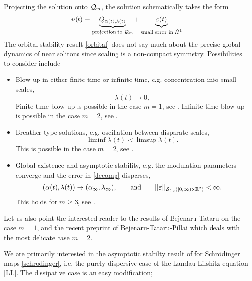 Projecting the solution onto $\mathcal Q_m$, the solution schematically takes the form 
\begin{equation}\label{eq:decomp}
	u(t) = \underbrace{Q_{\alpha(t), \lambda(t)}}_{\text{projection to $\mathcal Q_m$}} + \underbrace{\varepsilon(t)}_{\text{small error in $\dot H^1$}}
\end{equation}
The orbital stability result \eqref{orbital} does not say much about the precise global dynamics of near solitons since scaling is a non-compact symmetry. Possibilities to consider include 
	\begin{itemize}
		\item Blow-up in either finite-time or infinite time, e.g. concentration into small scales,
			\[\lambda(t) \to 0,\]
		Finite-time blow-up is possible in the case $m = 1$, see \cite{merle2011blow,perelman2014blow}. Infinite-time blow-up is possible in the case $m = 2$, see \cite[Theorem 2]{GustafsonEtAl2010}.

		\item Breather-type solutions, e.g. oscillation between disparate scales, 
			\[
				\liminf \lambda(t) < \limsup \lambda(t). 
			\]
		This is possible in the case $m = 2$, see \cite[Theorem 2]{GustafsonEtAl2010}.

		\item Global existence and asymptotic stability, e.g. the modulation parameters converge and the error in \eqref{decomp} disperses, 
			\begin{align*}
				(\alpha(t), \lambda(t)) 
					\to (\alpha_\infty,\lambda_\infty),\qquad \text{and} \qquad
				||\varepsilon||_{\mathcal S_{t, x}([0, \infty) \times \mathbb R^2)} 
					< \infty.
			\end{align*}
		This holds for $m \geq 3$, see \cite[Theorem 1]{GustafsonEtAl2010}. 
	\end{itemize}
\begin{remark}
	Let us also point the interested reader to the results of Bejenaru-Tataru \cite{BejenaruTataru2014} on the case $m = 1$, and the recent preprint of Bejenaru-Tataru-Pillai \cite{bejenaru2024near} which deals with the most delicate case $m = 2$. 
\end{remark}

We are primarily interested in the asymptotic stabilty result of \cite[Theorem 1]{GustafsonEtAl2010} for Schr\"odinger maps \eqref{schrodinger}, i.e. the purely dispersive case of the Landau-Lifshitz equation \eqref{LL}. The dissipative case is an easy modification; 

